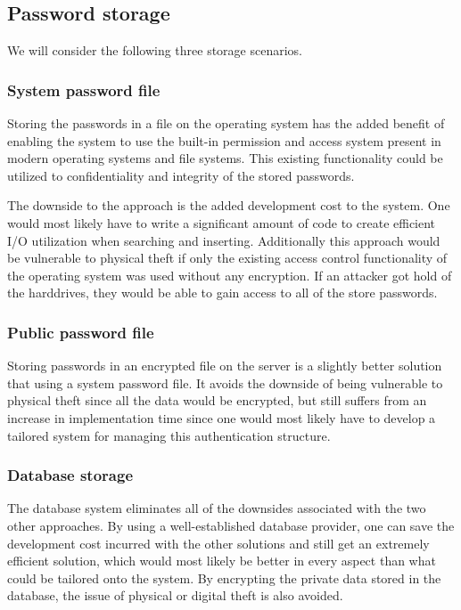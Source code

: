 \documentclass[12pt]{article}
\begin{document}
\newpage

\subsection{Password storage}
\label{sub:Password storage}

We will consider the following three storage scenarios.

\subsubsection{System password file}
\label{subs:System password file}

Storing the passwords in a file on the operating system has the added benefit of enabling the system to use the built-in permission and access system present in modern operating systems and file systems. This existing functionality could be utilized to confidentiality and integrity of the stored passwords.

The downside to the approach is the added development cost to the system. One would most likely have to write a significant amount of code to create efficient I/O utilization when searching and inserting.
Additionally this approach would be vulnerable to physical theft if only the existing access control functionality of the operating system was used without any encryption. If an attacker got hold of the harddrives, they would be able to gain access to all of the store passwords.

\subsubsection{Public password file}
\label{subs:Public password file}

Storing passwords in an encrypted file on the server is a slightly better solution that using a system password file. It avoids the downside of being vulnerable to physical theft since all the data would be encrypted, but still suffers from an increase in implementation time since one would most likely have to develop a tailored system for managing this authentication structure.

\subsubsection{Database storage}
\label{subs:Database storage}

The database system eliminates all of the downsides associated with the two other approaches. By using a well-established database provider, one can save the development cost incurred with the other solutions and still get an extremely efficient solution, which would most likely be better in every aspect than what could be tailored onto the system. By encrypting the private data stored in the database, the issue of physical or digital theft is also avoided.
\end{document}
